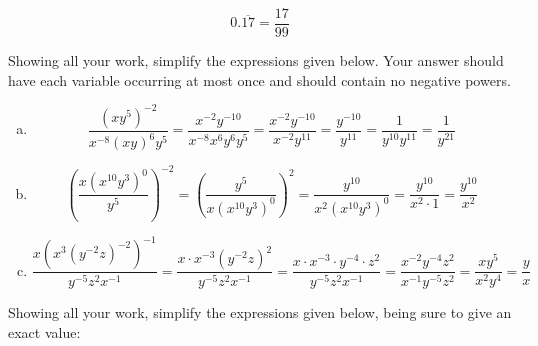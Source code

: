 \documentclass[12pt,letterpaper]{exam}
\begin{document}
\begin{questions}
	\[
	0.\overline{17}= \dfrac{17}{99}
	\]



\newpage
\question Showing all your work, simplify the expressions given below. Your answer should have each variable occurring at most once and should contain no negative powers.
	 \pspace

\sol
\begin{enumerate}[(a)]
\item 
	\[
	\dfrac{(x y^5)^{-2}}{x^{-8} (x y)^6 y^5}= \dfrac{x^{-2} y^{-10}}{x^{-8} x^6 y^6 y^5}= \dfrac{x^{-2} y^{-10}}{x^{-2} y^{11}}= \dfrac{y^{-10}}{y^{11}}= \dfrac{1}{y^{10} y^{11}}= \dfrac{1}{y^{21}}
	\] \pspace

\item 
	\[
	\left( \dfrac{x (x^{10} y^{3})^0}{y^5} \right)^{-2}= \left( \dfrac{y^5}{x (x^{10} y^{3})^0} \right)^2= \dfrac{y^{10}}{x^2 (x^{10} y^3)^0}= \dfrac{y^{10}}{x^2 \cdot 1}= \dfrac{y^{10}}{x^2}
	\] \pspace

\item 
	\[
	\dfrac{x \left( x^3 (y^{-2} z)^{-2} \right)^{-1}}{y^{-5} z^{2} x^{-1}}= \dfrac{x \cdot x^{-3} (y^{-2} z)^2}{y^{-5} z^2 x^{-1}}= \dfrac{x \cdot x^{-3} \cdot y^{-4} \cdot z^2}{y^{-5} z^2 x^{-1}}= \dfrac{x^{-2} y^{-4} z^2}{x^{-1} y^{-5} z^2}= \dfrac{x y^5}{x^2 y^4}= \dfrac{y}{x}
	\]
\end{enumerate}



\newpage
\question Showing all your work, simplify the expressions given below, being sure to give an exact value:
\end{questions}
\end{document}
